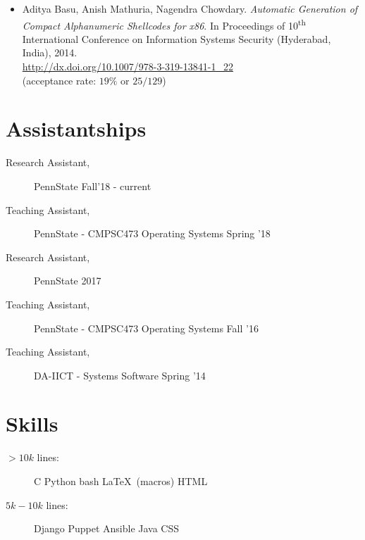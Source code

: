 \documentclass[margin]{res}
\begin{document}
\begin{resume}
\begin{itemize}
\item
    Aditya Basu, Anish Mathuria, Nagendra Chowdary.
    \emph{Automatic Generation of Compact Alphanumeric Shellcodes for x86}.
    In Proceedings of 10\textsuperscript{th} International Conference on Information Systems Security (Hyderabad, India), 2014.\\
    \url{http://dx.doi.org/10.1007/978-3-319-13841-1_22}\\
    (acceptance rate: $19\%$ or $25/129$)\\
\end{itemize}

\section{Assistantships} 
\begin{description}
    \item[Research Assistant,] PennState \hfill Fall'18 - current
    \item[Teaching Assistant,] PennState - CMPSC473 Operating Systems \hfill Spring '18 %
    \item[Research Assistant,] PennState \hfill 2017
    \item[Teaching Assistant,] PennState - CMPSC473 Operating Systems \hfill Fall '16 %
    \item[Teaching Assistant,] DA-IICT - Systems Software \hfill Spring '14 %
\end{description}

\section{Skills}
\begin{description}
    \item[$>10k$ lines:]
        C \textbullet{}
        Python \textbullet{}
        bash \textbullet{}
        \LaTeX\ (macros) \textbullet{}
        HTML

    \item[$5k-10k$ lines:]
        Django \textbullet{}
        Puppet \textbullet{}
        Ansible \textbullet{}
        Java \textbullet{}
        CSS


\end{description}
\end{resume}
\end{document}
